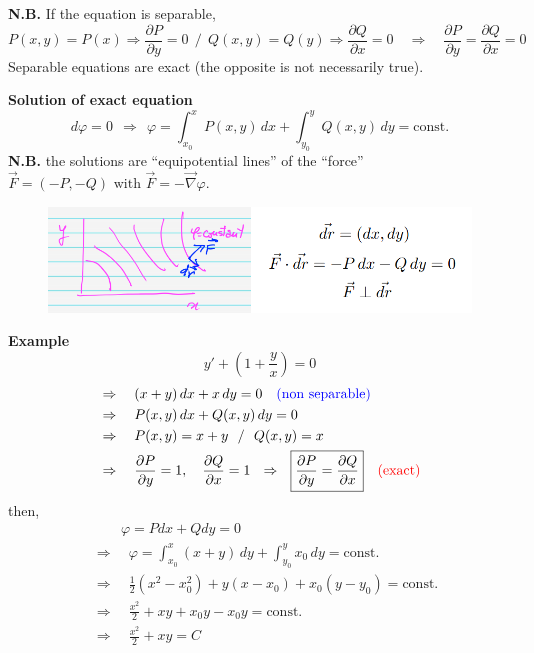 \documentclass{article}
\begin{document}
\noindent
\textbf{N.B.} If the equation is separable,
\begin{equation}
    P(x, y) = P(x) \Rightarrow \frac{\partial P}{\partial y} = 0 \ \  / \ \  Q(x, y) = Q(y) \Rightarrow \frac{\partial Q}{\partial x} = 0 \quad \Rightarrow \quad \frac{\partial P}{\partial y} = \frac{\partial Q}{\partial x} = 0 
\end{equation}
Separable equations are exact (the opposite is not necessarily true).

\vspace{2mm}\noindent
\textbf{Solution of exact equation}
\begin{equation}
    d\varphi = 0 \ \ \Rightarrow \ \  
\varphi = \int_{x_0}^{x} P(x, y)\,dx + \int_{y_0}^{y} Q(x, y)\,dy = \text{const.}
\end{equation}
\textbf{N.B.} the solutions are ``equipotential lines'' of the ``force'' $\vec{F} = (-P, -Q) \text{ with } \vec{F} = -\vec{\nabla} \varphi$.
\begin{figure}[h]
    \centering
    \includegraphics[width=0.75\linewidth]{fig1.png}
\end{figure}

\newpage

\noindent
\textbf{Example}
\begin{equation}
    y' + \left( 1 + \frac{y}{x} \right) = 0
\end{equation}
\begin{align*}
    &\Rightarrow \quad (x + y)\,dx + x\,dy = 0 \quad \textcolor{blue}{\text{(non separable)}}\\
    &\Rightarrow \quad P(x, y)\,dx + Q(x, y)\,dy = 0 \\
    &\Rightarrow \quad P(x, y) = x + y \ \ / \ \ Q(x,y) = x\\
    &\Rightarrow \quad \frac{\partial P}{\partial y} = 1, \quad 
\frac{\partial Q}{\partial x} = 1 \ \ \Rightarrow \ \ \boxed{\frac{\partial P}{\partial y} = \frac{\partial Q}{\partial x}} \quad \textcolor{red}{\text{(exact)}}
\end{align*}
then,
\begin{align*}
    & \quad \quad \varphi = Pdx + Qdy = 0\\
    &\Rightarrow \quad \varphi = \int_{x_0}^{x} (x + y)\,dy + \int_{y_0}^{y} x_0\,dy = \text{const.} \\
    &\Rightarrow \quad \frac{1}{2}(x^2 - x_0^2) + y(x - x_0) + x_0(y - y_0) = \text{const.}\\
    &\Rightarrow \quad \frac{x^2}{2} + xy + x_0 y - x_0 y = \text{const.}\\
    &\Rightarrow \quad \frac{x^2}{2} + xy = C
\end{align*}
\end{document}
